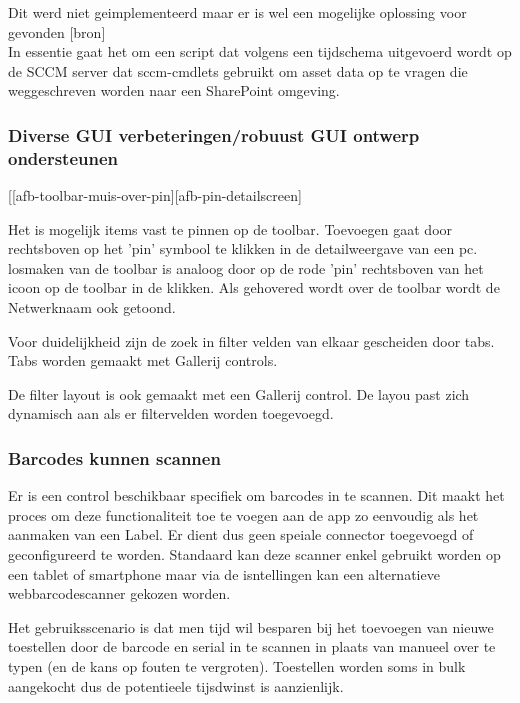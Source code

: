 Dit werd niet geimplementeerd maar er is wel een mogelijke oplossing voor gevonden [bron]\\
In essentie gaat het om een script dat volgens een tijdschema uitgevoerd wordt op de SCCM server dat sccm-cmdlets gebruikt om asset data op te vragen die weggeschreven worden naar een SharePoint omgeving.


\subsubsection{Diverse GUI verbeteringen/robuust GUI ontwerp ondersteunen}

[[afb-toolbar-muis-over-pin][afb-pin-detailscreen]

Het is mogelijk items vast te pinnen op de toolbar. Toevoegen gaat door rechtsboven op het 'pin' symbool te klikken in de detailweergave van een pc. losmaken van de toolbar is analoog door op de rode 'pin' rechtsboven van het icoon op de toolbar in de klikken. Als gehovered wordt over de toolbar wordt de Netwerknaam ook getoond.

Voor duidelijkheid zijn de zoek in filter velden van elkaar gescheiden door tabs. Tabs worden gemaakt met Gallerij controls.

De filter layout is ook gemaakt met een Gallerij control. De layou past zich dynamisch aan als er filtervelden worden toegevoegd.

\subsubsection{Barcodes kunnen scannen}

Er is een control beschikbaar specifiek om barcodes in te scannen. Dit maakt het proces om deze functionaliteit toe te voegen aan de app zo eenvoudig als het aanmaken van een Label. Er dient dus geen speiale connector toegevoegd of geconfigureerd te worden. Standaard kan deze scanner enkel gebruikt worden op een tablet of smartphone maar via de isntellingen kan een alternatieve webbarcodescanner gekozen worden.

Het gebruiksscenario is dat men tijd wil besparen bij het toevoegen van nieuwe toestellen door de barcode en serial in te scannen in plaats van manueel over te typen (en de kans op fouten te vergroten). Toestellen worden soms in bulk aangekocht dus de potentieele tijsdwinst is aanzienlijk.

